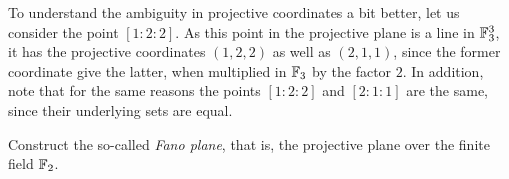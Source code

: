 \begin{example}
To understand the ambiguity in projective coordinates a bit better, let us consider the point $[1:2:2]$. As this point in the projective plane is a line in $\mathbb{F}_3^3$, it has the projective coordinates $(1,2,2)$ as well as $(2,1,1)$, since the former coordinate give the latter, when multiplied in $\mathbb{F}_3$ by the factor $2$. In addition, note that for the same reasons the points $[1:2:2]$ and $[2:1:1]$ are the same, since their underlying sets are equal.
\end{example}
\begin{exercise}
Construct the so-called \textit{Fano plane}, that is, the projective plane over the finite field $\mathbb{F}_2$.
\end{exercise}
